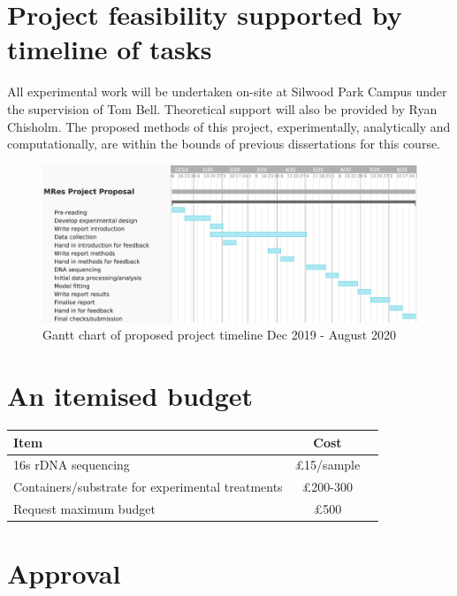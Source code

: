 \documentclass[11pt]{article}
\begin{document}
\section{Project feasibility supported by timeline of tasks}
All experimental work will be undertaken on-site at Silwood Park Campus under the supervision of Tom Bell. Theoretical support will also be provided by Ryan Chisholm. The proposed methods of this project, experimentally, analytically and computationally, are within the bounds of previous dissertations for this course. 
\begin{figure}[h!] 
	\includegraphics[width=\linewidth]{gantt_chart.png}
	\caption{Gantt chart of proposed project timeline Dec 2019 - August 2020} 
\end{figure}

\section{An itemised budget}
\begin{table}[h!]
  \begin{center}
    \begin{tabular}{l|c|r} %
      \textbf{Item} & \textbf{Cost}}\\
      \hline{} 
      16s rDNA sequencing & \pounds15/sample\\
      Containers/substrate for experimental treatments & \pounds200-300\\
      \hline{}
      Request maximum budget & \pounds500\\
    \end{tabular}
  \end{center}
\end{table}

\newpage
  
  
 
\newpage
\section{Approval}
\end{document}
